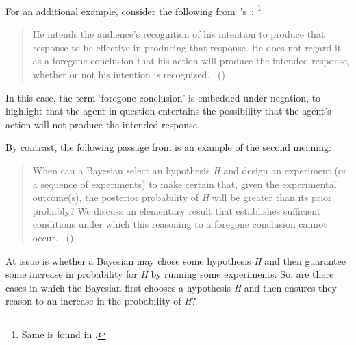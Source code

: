 \begin{note}
  For an additional example, consider the following from~\citeauthor{Grice:1957vg}'s~:%
  \footnote{
    Same is found in \textcite[219]{Grice:1989uf}.
  }
  \begin{quote}
    He intends the audience's recognition of his intention to produce that response to be effective in producing that response.
    He does not regard it as a foregone conclusion that his action will produce the intended response, whether or not his intention is recognized.\newline
    \mbox{ }\hfill\mbox{(\citeyear[385]{Grice:1957vg})}
  \end{quote}

  In this case, the term `foregone conclusion' is embedded under negation, to highlight that the agent in question entertains the possibility that the agent's action will not produce the intended response.



  By contrast, the following passage from \textcite{Kadane:1996vu} is an example of the second meaning:

  \begin{quote}
    When can a Bayesian select an hypothesis \emph{H} and design an experiment (or a sequence of experiments) to make certain that, given the experimental outcome(s), the posterior probability of \emph{H} will be greater than its prior probably?
    We discuss an elementary result that establishes sufficient conditions under which this reasoning to a foregone conclusion cannot occur.%
    \mbox{ }\hfill\mbox{(\citeyear[1228]{Kadane:1996vu})}
  \end{quote}

  At issue is whether a Bayesian may chose some hypothesis \emph{H} and then guarantee some increase in probability for \emph{H} by running some experiments.
  So, are there cases in which the Bayesian first chooses a hypothesis \emph{H} and then ensures they reason to an increase in the probability of \emph{H}?
\end{note}

